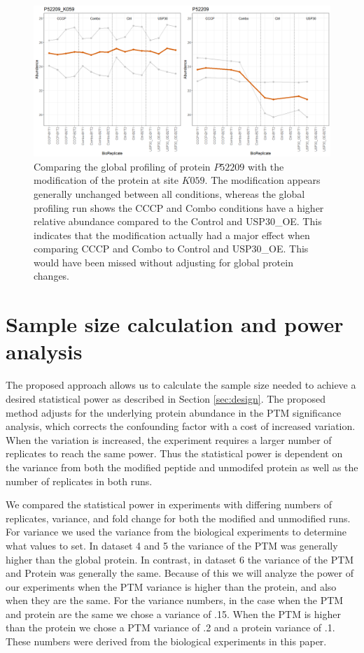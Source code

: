 \documentclass{mcp}
\begin{document}
\begin{figure}[h!]
\centering
\includegraphics[width=\textwidth]{sim_new/USP30_profile_plot}
\caption{Comparing the global profiling of protein $P52209$ with the modification of the protein at site $K059$. The modification appears generally unchanged between all conditions, whereas the global profiling run shows the CCCP and Combo conditions have a higher relative abundance compared to the Control and USP30\_OE. This indicates that the modification actually had a major effect when comparing CCCP and Combo to Control and USP30\_OE. This would have been missed without adjusting for global protein changes.}
\label{fig:USP30_profile_plot}
\end{figure}
\clearpage
\section{Sample size calculation and power analysis}

The proposed approach allows us to calculate the sample size needed to achieve a desired statistical power as described in Section \ref{sec:design}. The proposed method adjusts for the underlying protein abundance in the PTM significance analysis, which corrects the confounding factor with a cost of increased variation. When the variation is increased, the experiment requires a larger number of replicates to reach the same power. Thus the statistical power is dependent on the variance from both the modified peptide and unmodifed protein as well as the number of replicates in both runs.

We compared the statistical power in experiments with differing numbers of replicates, variance, and fold change for both the modified and unmodified runs. For variance we used the variance from the biological experiments to determine what values to set. In dataset 4 and 5 the variance of the PTM was generally higher than the global protein. In contrast, in dataset 6 the variance of the PTM and Protein was generally the same. Because of this we will analyze the power of our experiments when the PTM variance is higher than the protein, and also when they are the same. For the variance numbers, in the case when the PTM and protein are the same we chose a variance of .15. When the PTM is higher than the protein we chose a PTM variance of .2 and a protein variance of .1. These numbers were derived from the biological experiments in this paper.
\end{document}
